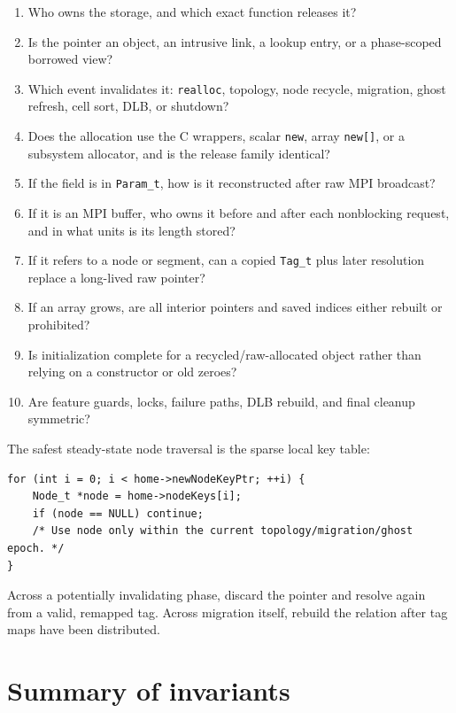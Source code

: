 \documentclass[11pt]{article}
\newcommand{\code}[1]{\texorpdfstring{\nolinkurl{#1}}{#1}}
\begin{document}
\begin{enumerate}
\item Who owns the storage, and which exact function releases it?
\item Is the pointer an object, an intrusive link, a lookup entry, or a
phase-scoped borrowed view?
\item Which event invalidates it: \code{realloc}, topology, node recycle,
migration, ghost refresh, cell sort, DLB, or shutdown?
\item Does the allocation use the C wrappers, scalar \code{new}, array
\code{new[]}, or a subsystem allocator, and is the release family identical?
\item If the field is in \code{Param_t}, how is it reconstructed after raw
MPI broadcast?
\item If it is an MPI buffer, who owns it before and after each nonblocking
request, and in what units is its length stored?
\item If it refers to a node or segment, can a copied \code{Tag_t} plus later
resolution replace a long-lived raw pointer?
\item If an array grows, are all interior pointers and saved indices either
rebuilt or prohibited?
\item Is initialization complete for a recycled/raw-allocated object rather
than relying on a constructor or old zeroes?
\item Are feature guards, locks, failure paths, DLB rebuild, and final cleanup
symmetric?
\end{enumerate}

The safest steady-state node traversal is the sparse local key table:

\begin{lstlisting}[style=cpp,numbers=none]
for (int i = 0; i < home->newNodeKeyPtr; ++i) {
    Node_t *node = home->nodeKeys[i];
    if (node == NULL) continue;
    /* Use node only within the current topology/migration/ghost epoch. */
}
\end{lstlisting}

Across a potentially invalidating phase, discard the pointer and resolve
again from a valid, remapped tag.  Across migration itself, rebuild the
relation after tag maps have been distributed.

\section{Summary of invariants}
\end{document}
